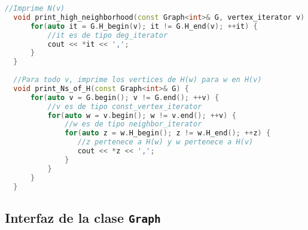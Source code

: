 \documentclass[%
    a4paper,%
    fontsize=12pt,%
    DIV=12,
    twoside,%
    openright,%
    titlepage=true,%
    headsepline,%
    toc=bibliography,%
    parskip=half,%
    cleardoublepage=empty,%
    headings=big,%
]{scrbook}
\makeatletter
\newcommand{\Code}[2][]{\lstinline[basicstyle={\ttfamily},#1]@#2@}
\newcommand{\CPPCode}[2][]{\lstinline[language=C++,basicstyle={\ttfamily},#1]@#2@}
\makeatother
\begin{document}
\begin{lstlisting}[caption={Ejemplo de uso de \CPPCode{deg_iterator}.  En el ejemplo, se accede a $H(v)$ para un vértice $v$ invocando \Code{H_begin} usando el grafo, usando directamente un \Code{vertex_iterator} y usando un \Code{deg_iterator}.},name=deg_iterator,gobble=2,float=ht,label={lst:c++:deg_iterator},language=C++]
  //Imprime N(v)
  void print_high_neighborhood(const Graph<int>& G, vertex_iterator v) {
      for(auto it = G.H_begin(v); it != G.H_end(v); ++it) {
          //it es de tipo deg_iterator
          cout << *it << ',';
      }
  }
  
  //Para todo v, imprime los vertices de H(w) para w en H(v)
  void print_Ns_of_H(const Graph<int>& G) {
      for(auto v = G.begin(); v != G.end(); ++v) {
          //v es de tipo const_vertex_iterator
          for(auto w = v.begin(); w != v.end(); ++v) {
              //w es de tipo neighbor_iterator
              for(auto z = w.H_begin(); z != w.H_end(); ++z) {
                 //z pertenece a H(w) y w pertenece a H(v)
                 cout << *z << ',';
              }
          }
      }
  }
\end{lstlisting}

% 
% 

\subsection{Interfaz de la clase \texorpdfstring{\protect\CPPCode{Graph}}{Graph}}
\end{document}
